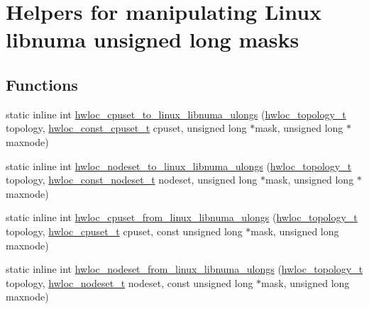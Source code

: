 \hypertarget{a00068}{
\section{Helpers for manipulating Linux libnuma unsigned long masks}
\label{a00068}
}
\subsection*{Functions}
\begin{DoxyCompactItemize}
\item 
static inline int \hyperlink{a00068_ga018e57a42a780ce2ba2e35ef975d8888}{hwloc\_\-cpuset\_\-to\_\-linux\_\-libnuma\_\-ulongs} (\hyperlink{a00039_ga9d1e76ee15a7dee158b786c30b6a6e38}{hwloc\_\-topology\_\-t} topology, \hyperlink{a00040_ga1f784433e9b606261f62d1134f6a3b25}{hwloc\_\-const\_\-cpuset\_\-t} cpuset, unsigned long $\ast$mask, unsigned long $\ast$maxnode)
\item 
static inline int \hyperlink{a00068_gaf213df50d229c5d17a5a56b5d8f10b74}{hwloc\_\-nodeset\_\-to\_\-linux\_\-libnuma\_\-ulongs} (\hyperlink{a00039_ga9d1e76ee15a7dee158b786c30b6a6e38}{hwloc\_\-topology\_\-t} topology, \hyperlink{a00040_ga2f5276235841ad66a79bedad16a5a10c}{hwloc\_\-const\_\-nodeset\_\-t} nodeset, unsigned long $\ast$mask, unsigned long $\ast$maxnode)
\item 
static inline int \hyperlink{a00068_gafa60816dde33d69149497bcf6c7818e0}{hwloc\_\-cpuset\_\-from\_\-linux\_\-libnuma\_\-ulongs} (\hyperlink{a00039_ga9d1e76ee15a7dee158b786c30b6a6e38}{hwloc\_\-topology\_\-t} topology, \hyperlink{a00040_ga4bbf39b68b6f568fb92739e7c0ea7801}{hwloc\_\-cpuset\_\-t} cpuset, const unsigned long $\ast$mask, unsigned long maxnode)
\item 
static inline int \hyperlink{a00068_ga5b51a4a96a0c3ad9f4c0da308bbf4d8f}{hwloc\_\-nodeset\_\-from\_\-linux\_\-libnuma\_\-ulongs} (\hyperlink{a00039_ga9d1e76ee15a7dee158b786c30b6a6e38}{hwloc\_\-topology\_\-t} topology, \hyperlink{a00040_ga37e35730fa7e775b5bb0afe893d6d508}{hwloc\_\-nodeset\_\-t} nodeset, const unsigned long $\ast$mask, unsigned long maxnode)
\end{DoxyCompactItemize}


